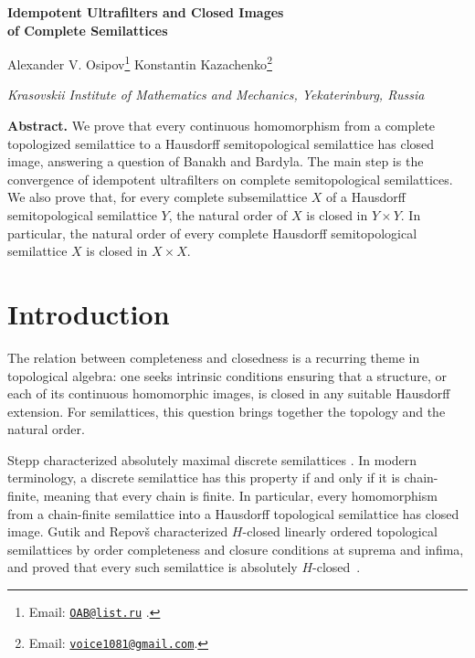 \documentclass[11pt,a4paper]{article}
\theoremstyle{definition}
\theoremstyle{remark}
\numberwithin{equation}{section}
\begin{document}
\color{ink}
\thispagestyle{plain}
\begin{center}
{\fontsize{18}{21}\selectfont\bfseries Idempotent Ultrafilters and Closed Images\\[0.15em]
of Complete Semilattices\par}
\vspace{0.8em}
{\normalsize Alexander V. Osipov\footnote{Email: \href{mailto:OAB@list.ru}{\texttt{OAB@list.ru}} .}\quad
Konstantin Kazachenko\footnote{Email: \href{mailto:voice1081@gmail.com}{\texttt{voice1081@gmail.com}}.}\par}
\vspace{0.35em}
{\small\itshape Krasovskii Institute of Mathematics and Mechanics, Yekaterinburg, Russia\par}

\end{center}

\vspace{0.4em}
\begin{list}{}{\setlength{\leftmargin}{14pt}\setlength{\rightmargin}{14pt}}
\item[]\small\textbf{\color{sectionblue}Abstract.}
We prove that every continuous homomorphism from a complete topologized
semilattice to a Hausdorff semitopological semilattice has closed image,
answering a question of Banakh and Bardyla. The main step is the
convergence of idempotent ultrafilters on complete semitopological
semilattices. We also prove that, for every complete subsemilattice
\(X\) of a Hausdorff semitopological semilattice \(Y\), the natural
order of \(X\) is closed in \(Y\times Y\). In particular, the natural
order of every complete Hausdorff semitopological semilattice \(X\)
is closed in \(X\times X\).
\end{list}
\vspace{-0.5em}
\tableofcontents
\section*{Introduction}

The relation between completeness and closedness is a recurring theme in
topological algebra: one seeks intrinsic conditions ensuring that a
structure, or each of its continuous homomorphic images, is closed in
any suitable Hausdorff extension. For semilattices, this question brings
together the topology and the natural order.

Stepp characterized absolutely maximal discrete semilattices
\cite[Theorem~9]{S75}. In modern terminology, a discrete semilattice
has this property if and only if it is chain-finite, meaning that every
chain is finite. In particular, every homomorphism from a chain-finite
semilattice into a Hausdorff topological semilattice has closed image.
Gutik and Repov\v{s} characterized \(H\)-closed linearly ordered
topological semilattices by order completeness and closure conditions
at suprema and infima, and proved that every such semilattice is
absolutely \(H\)-closed~\cite[Theorems~2 and~3]{GR08}.
\end{document}
